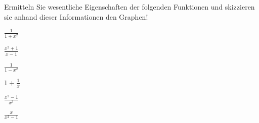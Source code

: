 \item Ermitteln Sie wesentliche Eigenschaften der folgenden Funktionen und skizzieren sie anhand dieser Informationen den Graphen!
\begin{enumerate}
\begin{multicols}{3}
\item $\frac{1}{1+x^2}$ 
\item $\frac{x^2+1}{x-1}$ 
\item $\frac{1}{1-x^2}$ 
\item $1+\frac{1}{x}$ 
\item $\frac{x^2-1}{x^3}$
\item $\frac{x}{x^2-1}$
\end{multicols}
\end{enumerate}
